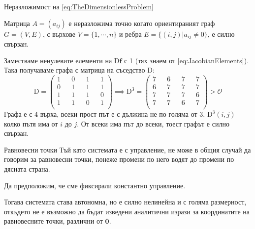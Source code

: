   \begin{frame}[t]{Неразложимост на \eqref{eq:TheDimensionlessProblem}}
  \begin{theorem}
  \label{theorem:ConnectedIrreducability}
  Матрица $A=(a_{ij})$ е неразложима точно когато ориентираният граф $G=(V,E)$, с върхове $V=\{1, \cdots, n\}$ и ребра $E=\{(i,j) \vert a_{ij} \neq 0 \}$, е силно свързан.
  \end{theorem}

  Заместваме ненулевите елементи на $\mathrm{D} \boldsymbol{f}$ с 1 (тях знаем от \eqref{eq:JacobianElements}). Така получаваме графа с матрица на съседство $\mathrm{D}$:
  \begin{equation*}
    \mathrm{D} =
    \begin{pmatrix}
      1 && 0 && 1 && 1 \\
      0 && 1 && 1 && 1 \\
      1 && 1 && 1 && 0 \\
      1 && 1 && 0 && 1 \\
    \end{pmatrix}
    \implies
    \mathrm{D}^3 =
    \begin{pmatrix}
      7 && 6 && 7 && 7 \\
      6 && 7 && 7 && 7 \\
      7 && 7 && 7 && 6 \\
      7 && 7 && 6 && 7 \\
    \end{pmatrix}
    >
    \mathscr{O}
  \end{equation*}
  Графа е с 4 върха, всеки прост път е с дължина не по-голяма от 3.
  $\mathrm{D}^3(i,j)$ - колко пътя има от $i$ до $j$.
  От всеки има път до всеки, тоест графът е силно свързан.
  \end{frame}

\begin{frame}[t]{Равновесни точки}
Тъй като системата е с управление, не може в общия случай да говорим за равновесни точки, понеже промени по него водят до промени по дясната страна.

Да предположим, че сме фиксирали константно управление.

Тогава системата става автономна, но е силно нелинейна и с голяма размерност, откъдето не е възможно да бъдат изведени аналитични изрази за координатите на равновесните точки, различни от $\boldsymbol{0}$.
\end{frame}

